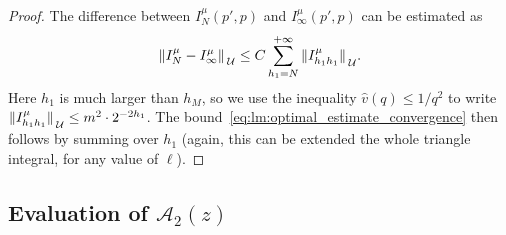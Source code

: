 \documentclass[a4paper, 11pt]{article}
\theoremstyle{thm}
\begin{document}
\begin{proof}
The difference between $I^\mu_N(p', p)$ and $I^\mu_\infty(p', p)$ can be estimated as
\begin{equation}
\norm*{I^\mu_N- I^\mu_\infty}_\mathcal{U} \le C \sum_{h_1 = N}^{+\infty} \norm*{I^\mu_{h_1 h_1}}_\mathcal{U}.
\end{equation}
Here $h_1$ is much larger than $h_M$, so we use the inequality $\hat{v}(q) \le 1/q^2$ to write $\norm*{I^\mu_{h_1 h_1}}_\mathcal{U} \le m^2 \cdot 2^{-2h_1}$. The bound~\eqref{eq:lm:optimal_estimate_convergence} then follows by summing over $h_1$ (again, this can be extended the whole triangle integral, for any value of $\ell$).
\end{proof}

\subsection{Evaluation of \texorpdfstring{$\mathcal{A}_2(z)$}{gyr}}
\label{subsec:A_evaluation_first_order}
\end{document}
